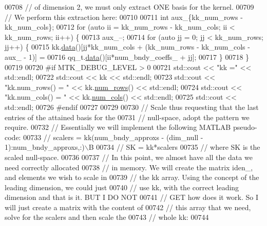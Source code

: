 \begin{DoxyCode}
{{00708   \textcolor{comment}{// of dimension 2, we must only extract ONE basis for the kernel.}
00709   \textcolor{comment}{// We perform this extraction here:}
00710 
00711   \textcolor{keywordtype}{int} aux\_\{kk\_num\_rows - kk\_num\_cols\};
00712   \textcolor{keywordflow}{for} (\textcolor{keyword}{auto} ii = kk\_num\_rows - kk\_num\_cols; ii < kk\_num\_rows; ii++) \{
00713     aux\_--;
00714     \textcolor{keywordflow}{for} (\textcolor{keyword}{auto} jj = 0; jj < kk\_num\_rows; jj++) \{
00715       kk.\hyperlink{classmtk_1_1DenseMatrix_a16b3ff56feb2658b9fc7147d1de4d8e7}{data}()[jj*kk\_num\_cols + (kk\_num\_rows - kk\_num\_cols - aux\_ - 1)] =
00716         qq\_t.\hyperlink{classmtk_1_1DenseMatrix_a16b3ff56feb2658b9fc7147d1de4d8e7}{data}()[ii*num\_bndy\_coeffs\_ + jj];
00717     \}
00718   \}
00719 
00720 \textcolor{preprocessor}{  #if MTK\_DEBUG\_LEVEL > 0}
00721   std::cout << \textcolor{stringliteral}{"kk ="} << std::endl;
00722   std::cout << kk << std::endl;
00723   std::cout << \textcolor{stringliteral}{"kk.num\_rows() = "} << kk.\hyperlink{classmtk_1_1DenseMatrix_a17d8d3b9cc0926044b6972dd190a5c21}{num\_rows}() << std::endl;
00724   std::cout << \textcolor{stringliteral}{"kk.num\_cols() = "} << kk.\hyperlink{classmtk_1_1DenseMatrix_af6f78373aaf2136f0c78974d7c8de0a8}{num\_cols}() << std::endl;
00725   std::cout << std::endl;
00726 \textcolor{preprocessor}{  #endif}
00727 
00729 
00730   \textcolor{comment}{// Scale thus requesting that the last entries of the attained basis for the}
00731   \textcolor{comment}{// null-space, adopt the pattern we require.}
00732   \textcolor{comment}{// Essentially we will implement the following MATLAB pseudo-code:}
00733   \textcolor{comment}{//  scalers = kk(num\_bndy\_approxs - (dim\_null - 1):num\_bndy\_approxs,:)\(\backslash\)B}
00734   \textcolor{comment}{//  SK = kk*scalers}
00735   \textcolor{comment}{// where SK is the scaled null-space.}
00736 
00737   \textcolor{comment}{// In this point, we almost have all the data we need correctly allocated}
00738   \textcolor{comment}{// in memory. We will create the matrix iden\_, and elements we wish to scale in}
00739   \textcolor{comment}{// the kk array. Using the concept of the leading dimension, we could just}
00740   \textcolor{comment}{// use kk, with the correct leading dimension and that is it. BUT I DO NOT}
00741   \textcolor{comment}{// GET how does it work. So I will just create a matrix with the content of}
00742   \textcolor{comment}{// this array that we need, solve for the scalers and then scale the}
00743   \textcolor{comment}{// whole kk:}
00744 
}}
\end{DoxyCode}
